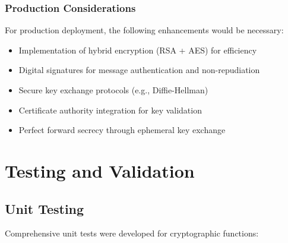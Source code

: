 \documentclass[12pt,a4paper]{article}
\begin{document}
\subsubsection{Production Considerations}

For production deployment, the following enhancements would be necessary:

\begin{itemize}
    \item Implementation of hybrid encryption (RSA + AES) for efficiency
    \item Digital signatures for message authentication and non-repudiation
    \item Secure key exchange protocols (e.g., Diffie-Hellman)
    \item Certificate authority integration for key validation
    \item Perfect forward secrecy through ephemeral key exchange
\end{itemize}

\section{Testing and Validation}

\subsection{Unit Testing}

Comprehensive unit tests were developed for cryptographic functions:
\end{document}
